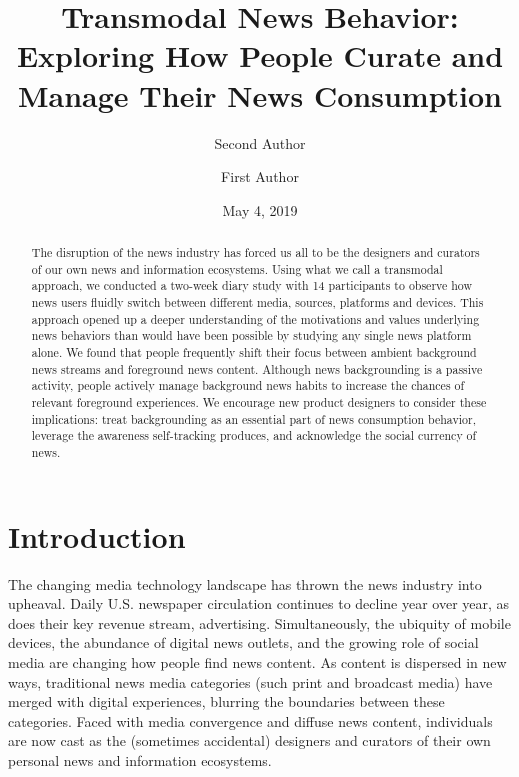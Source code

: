 \documentclass[sigchi]{acmart}
\title[Transmodal News Behavior]{Transmodal News Behavior: Exploring How People Curate and Manage Their News Consumption}
\date{May 4, 2019}
\begin{document}
\raggedbottom


\author{Second Author}

\author{First Author}
  



\begin{abstract}
The disruption of the news industry has forced us all to be the designers and curators of our own news and information ecosystems. Using what we call a transmodal approach, we conducted a two-week diary study with 14 participants to observe how news users fluidly switch between different media, sources, platforms and devices. This approach opened up a deeper understanding of the motivations and values underlying news behaviors than would have been possible by studying any single news platform alone. We found that people frequently shift their focus between ambient background news streams and foreground news content. Although news backgrounding is a passive activity, people actively manage background news habits to increase the chances of relevant foreground experiences. We encourage new product designers to consider these implications: treat backgrounding as an essential part of news consumption behavior, leverage the awareness self-tracking produces, and acknowledge the social currency of news.
\end{abstract}



\maketitle

\section{Introduction}
The changing media technology landscape has thrown the news industry into upheaval. Daily U.S. newspaper circulation continues to decline year over year, as does their key revenue stream, advertising\cite{pewnewspapers}.\cite{pew} Simultaneously, the ubiquity of mobile devices, the abundance of digital news outlets, and the growing role of social media are changing how people find news content. As content is dispersed in new ways, traditional news media categories (such print and broadcast media) have merged with digital experiences, blurring the boundaries between these categories. Faced with media convergence and diffuse news content, individuals are now cast as the (sometimes accidental) designers and curators of their own personal news and information ecosystems.
\end{document}
